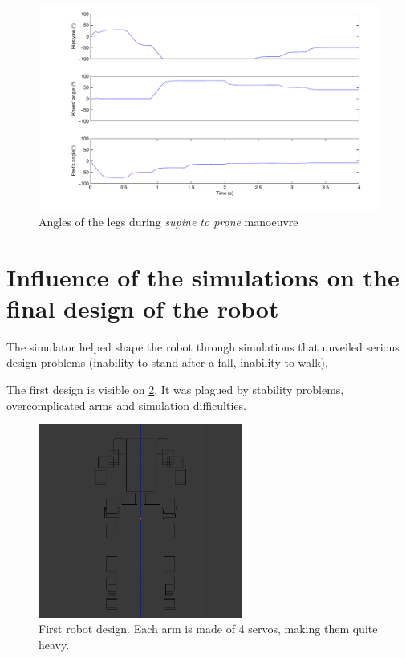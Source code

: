 \begin{figure}[htp]
\center
    \includegraphics[width = \textwidth]{figures/prone2standLegs}
    \caption[Angles of the legs during \emph{supine to prone} manoeuvre]{Angles of the legs during \emph{supine to prone} manoeuvre}
    \label{fig:prone2standLegs}
\end{figure}

\section{Influence of the simulations on the final design of the robot}
The simulator helped shape the robot through simulations that unveiled serious design problems (inability to stand after a fall, inability to walk).

The first design is visible on \cref{fig:first_robot}. It was plagued by stability problems, overcomplicated arms and simulation difficulties. 
\begin{figure}[htp]
\center
\includegraphics[width=0.6\textwidth]{figures/robot1}
\caption[Initial robot design]{First robot design. Each arm is made of 4 servos, making them quite heavy.}
\label{fig:first_robot}
\end{figure}

